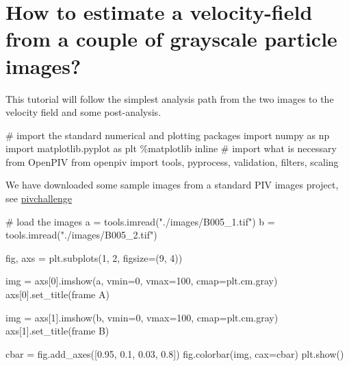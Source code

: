 \documentclass[
  english,
  letterpaper,
  numbers=noendperiod,
  DIV=13]{scrreprt}
\newenvironment{Shaded}{\begin{snugshade}}{\end{snugshade}}
\newcommand{\CommentTok}[1]{\textcolor[rgb]{0.37,0.37,0.37}{#1}}
\newcommand{\DecValTok}[1]{\textcolor[rgb]{0.68,0.00,0.00}{#1}}
\newcommand{\FloatTok}[1]{\textcolor[rgb]{0.68,0.00,0.00}{#1}}
\newcommand{\ImportTok}[1]{\textcolor[rgb]{0.00,0.46,0.62}{#1}}
\newcommand{\NormalTok}[1]{\textcolor[rgb]{0.00,0.23,0.31}{#1}}
\newcommand{\OperatorTok}[1]{\textcolor[rgb]{0.37,0.37,0.37}{#1}}
\newcommand{\StringTok}[1]{\textcolor[rgb]{0.13,0.47,0.30}{#1}}
\begin{document}
\section{How to estimate a velocity-field from a couple of grayscale
particle
images?}\label{how-to-estimate-a-velocity-field-from-a-couple-of-grayscale-particle-images}

This tutorial will follow the simplest analysis path from the two images
to the velocity field and some post-analysis.

\begin{Shaded}
\begin{Highlighting}[]
\CommentTok{\# import the standard numerical and plotting packages}
\ImportTok{import}\NormalTok{ numpy }\ImportTok{as}\NormalTok{ np}
\ImportTok{import}\NormalTok{ matplotlib.pyplot }\ImportTok{as}\NormalTok{ plt}
\OperatorTok{\%}\NormalTok{matplotlib inline}
\CommentTok{\# import what is necessary from OpenPIV}
\ImportTok{from}\NormalTok{ openpiv }\ImportTok{import}\NormalTok{ tools, pyprocess, validation, filters, scaling}
\end{Highlighting}
\end{Shaded}

We have downloaded some sample images from a standard PIV images
project, see \href{http://www.pivchallenge.org/pub/\#b}{pivchallenge}

\begin{Shaded}
\begin{Highlighting}[]
\CommentTok{\# load the images}
\NormalTok{a }\OperatorTok{=}\NormalTok{ tools.imread(}\StringTok{"./images/B005\_1.tif"}\NormalTok{)}
\NormalTok{b }\OperatorTok{=}\NormalTok{ tools.imread(}\StringTok{"./images/B005\_2.tif"}\NormalTok{)}

\NormalTok{fig, axs }\OperatorTok{=}\NormalTok{ plt.subplots(}\DecValTok{1}\NormalTok{, }\DecValTok{2}\NormalTok{, figsize}\OperatorTok{=}\NormalTok{(}\DecValTok{9}\NormalTok{, }\DecValTok{4}\NormalTok{))}

\NormalTok{img }\OperatorTok{=}\NormalTok{ axs[}\DecValTok{0}\NormalTok{].imshow(a, vmin}\OperatorTok{=}\DecValTok{0}\NormalTok{, vmax}\OperatorTok{=}\DecValTok{100}\NormalTok{, cmap}\OperatorTok{=}\NormalTok{plt.cm.gray)}
\NormalTok{axs[}\DecValTok{0}\NormalTok{].set\_title(}\StringTok{\textquotesingle{}frame A\textquotesingle{}}\NormalTok{)}

\NormalTok{img }\OperatorTok{=}\NormalTok{ axs[}\DecValTok{1}\NormalTok{].imshow(b, vmin}\OperatorTok{=}\DecValTok{0}\NormalTok{, vmax}\OperatorTok{=}\DecValTok{100}\NormalTok{, cmap}\OperatorTok{=}\NormalTok{plt.cm.gray)}
\NormalTok{axs[}\DecValTok{1}\NormalTok{].set\_title(}\StringTok{\textquotesingle{}frame B\textquotesingle{}}\NormalTok{)}

\NormalTok{cbar }\OperatorTok{=}\NormalTok{ fig.add\_axes([}\FloatTok{0.95}\NormalTok{, }\FloatTok{0.1}\NormalTok{, }\FloatTok{0.03}\NormalTok{, }\FloatTok{0.8}\NormalTok{])}
\NormalTok{fig.colorbar(img, cax}\OperatorTok{=}\NormalTok{cbar)}
\NormalTok{plt.show()}
\end{Highlighting}
\end{Shaded}
\end{document}
